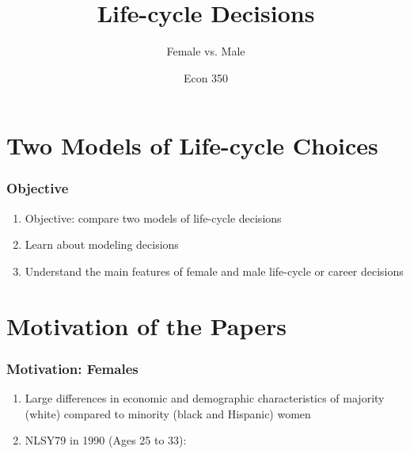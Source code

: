 

\title{Life-cycle Decisions}
\subtitle{Female vs. Male}
\author{Econ 350}



\begin{frame}[plain]
	\titlepage
\end{frame}



\section{Two Models of Life-cycle Choices}

\begin{frame}
	\frametitle{Objective}
		\begin{enumerate}
 			\item Objective: compare two models of life-cycle decisions
 			\item Learn about modeling decisions
 			\item Understand the main features of female and male life-cycle or career decisions
 		\end{enumerate}
\end{frame}

\section{Motivation of the Papers}
\begin{frame}
	\frametitle{Motivation: Females}
	\begin{enumerate}
		\item Large differences in economic and demographic characteristics of majority (white) compared to minority (black and Hispanic) women
		\item NLSY79 in 1990 (Ages 25 to 33):
	\end{enumerate}
\end{frame}

